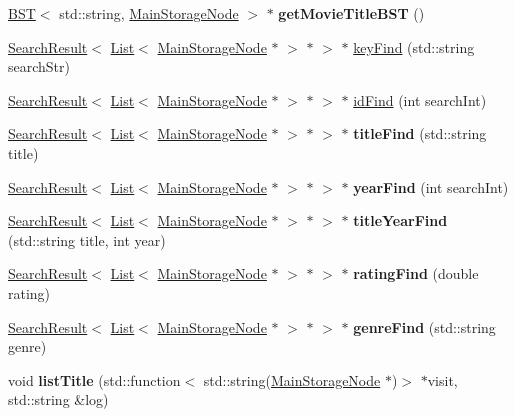 \begin{DoxyCompactItemize}
\item 
\mbox{\label{class_main_storage_a316c9eac7e443684da3f8b89215fdda7}} 
\hyperlink{class_b_s_t}{B\+ST}$<$ std\+::string, \hyperlink{class_main_storage_node}{Main\+Storage\+Node} $>$ $\ast$ {\bfseries get\+Movie\+Title\+B\+ST} ()
\item 
\hyperlink{class_search_result}{Search\+Result}$<$ \hyperlink{class_list}{List}$<$ \hyperlink{class_main_storage_node}{Main\+Storage\+Node} $\ast$ $>$ $\ast$ $>$ $\ast$ \hyperlink{class_main_storage_af620c9f7da276d31989a1e751b603fd3}{key\+Find} (std\+::string search\+Str)
\item 
\hyperlink{class_search_result}{Search\+Result}$<$ \hyperlink{class_list}{List}$<$ \hyperlink{class_main_storage_node}{Main\+Storage\+Node} $\ast$ $>$ $\ast$ $>$ $\ast$ \hyperlink{class_main_storage_a2738c8ec5cd21a7e505c2bbf21fde556}{id\+Find} (int search\+Int)
\item 
\mbox{\label{class_main_storage_ae1491e34a0d7e6003535683a77c82195}} 
\hyperlink{class_search_result}{Search\+Result}$<$ \hyperlink{class_list}{List}$<$ \hyperlink{class_main_storage_node}{Main\+Storage\+Node} $\ast$ $>$ $\ast$ $>$ $\ast$ {\bfseries title\+Find} (std\+::string title)
\item 
\mbox{\label{class_main_storage_aa91fe44ba5d343afc11340889e1a9ba0}} 
\hyperlink{class_search_result}{Search\+Result}$<$ \hyperlink{class_list}{List}$<$ \hyperlink{class_main_storage_node}{Main\+Storage\+Node} $\ast$ $>$ $\ast$ $>$ $\ast$ {\bfseries year\+Find} (int search\+Int)
\item 
\mbox{\label{class_main_storage_a821ccd05c221d9bbb4989375a8d2f0b1}} 
\hyperlink{class_search_result}{Search\+Result}$<$ \hyperlink{class_list}{List}$<$ \hyperlink{class_main_storage_node}{Main\+Storage\+Node} $\ast$ $>$ $\ast$ $>$ $\ast$ {\bfseries title\+Year\+Find} (std\+::string title, int year)
\item 
\mbox{\label{class_main_storage_a43297ae5b212402dcbaac088fb1a160e}} 
\hyperlink{class_search_result}{Search\+Result}$<$ \hyperlink{class_list}{List}$<$ \hyperlink{class_main_storage_node}{Main\+Storage\+Node} $\ast$ $>$ $\ast$ $>$ $\ast$ {\bfseries rating\+Find} (double rating)
\item 
\mbox{\label{class_main_storage_a914862f5fc98d1061175544e81468fbd}} 
\hyperlink{class_search_result}{Search\+Result}$<$ \hyperlink{class_list}{List}$<$ \hyperlink{class_main_storage_node}{Main\+Storage\+Node} $\ast$ $>$ $\ast$ $>$ $\ast$ {\bfseries genre\+Find} (std\+::string genre)
\item 
\mbox{\label{class_main_storage_a18ae96da48b015d573c926d9e9cad64b}} 
void {\bfseries list\+Title} (std\+::function$<$ std\+::string(\hyperlink{class_main_storage_node}{Main\+Storage\+Node} $\ast$)$>$ $\ast$visit, std\+::string \&log)
\end{DoxyCompactItemize}
